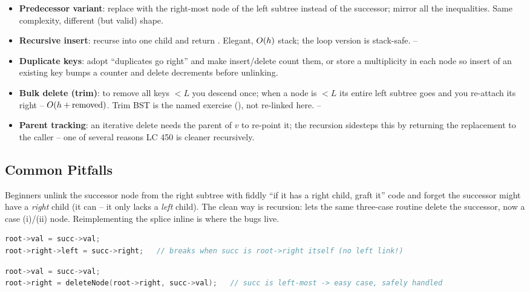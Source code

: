 \begin{itemize}[nosep]
  \item \textbf{Predecessor variant}: replace with the right-most node of the left subtree instead of
        the successor; mirror all the inequalities. Same complexity, different (but valid) shape. \hfill{}
  \item \textbf{Recursive insert}:  recurse into one child
        and return . Elegant, $O(h)$ stack; the loop version is stack-safe. \hfill{}--
  \item \textbf{Duplicate keys}: adopt ``duplicates go right'' and make insert/delete count them, or
        store a multiplicity in each node so insert of an existing key bumps a counter and delete
        decrements before unlinking. \hfill{}
  \item \textbf{Bulk delete (trim)}: to remove all keys $<L$ you descend once; when a node is $<L$ its
        entire left subtree goes and you re-attach its right -- $O(h + \text{removed})$. Trim BST
        is the named exercise (), not re-linked here. \hfill{}--
  \item \textbf{Parent tracking}: an iterative delete needs the parent of $v$ to re-point it; the
        recursion sidesteps this by returning the replacement to the caller -- one of several reasons
        LC 450 is cleaner recursively. \hfill{}
\end{itemize}

\subsection{Common Pitfalls}\label{sec:c05-delete-pitfalls}

\begin{warningbox}
Beginners unlink the successor node from the right subtree with fiddly ``if it has a right child,
graft it'' code and forget the successor might have a \emph{right} child (it can -- it only lacks a
\emph{left} child). The clean way is recursion: 
lets the same three-case routine delete the successor, now a case (i)/(ii) node. Reimplementing the
splice inline is where the bugs live.
\end{warningbox}
\begin{lstlisting}[caption={\textcolor{warningred}{WRONG}: hand-splice successor, ignoring its possible right child}, language=C++, basicstyle=\ttfamily\small]
root->val = succ->val;
root->right->left = succ->right;   // breaks when succ is root->right itself (no left link!)
\end{lstlisting}
\begin{lstlisting}[caption={\textcolor{successgreen}{RIGHT}: reuse the routine to delete the successor key}, language=C++, basicstyle=\ttfamily\small]
root->val = succ->val;
root->right = deleteNode(root->right, succ->val);   // succ is left-most -> easy case, safely handled
\end{lstlisting}

